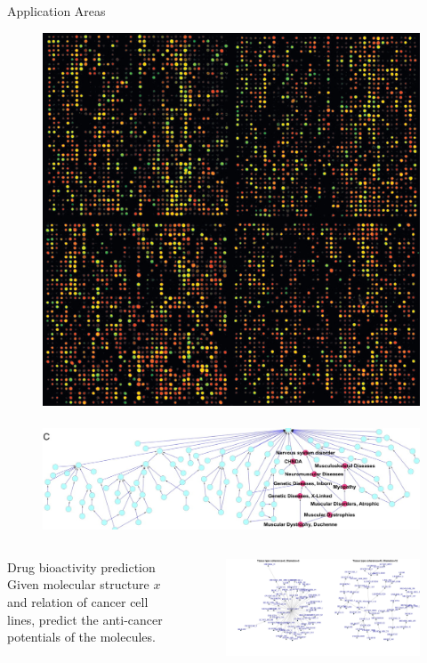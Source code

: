 \documentclass[first=dgreen,second=purple,logo=yellowexc]{aaltoslides}
\begin{document}
\begin{frame}[allowframebreaks]{Application Areas }
\begin{itemize}
\begin{figure}
            \includegraphics[scale=0.08]{./plots/microarray.jpg}\,
            \includegraphics[scale=0.18]{./plots/umls.jpg}
        \end{figure}
    \framebreak
     \begin{columns}
        \begin{column}{.6\linewidth}
    \item Drug bioactivity prediction \cite{su2010}\\ 
        Given molecular structure $x$ and relation of cancer cell lines, predict the anti-cancer potentials of the molecules.
        \end{column}
        \begin{column}{.3\linewidth}
        \begin{figure}
        \includegraphics[scale=0.2]{./plots/cancernet.pdf}

\end{figure}
\end{column}
\end{columns}
\end{itemize}
\end{frame}
\end{document}
